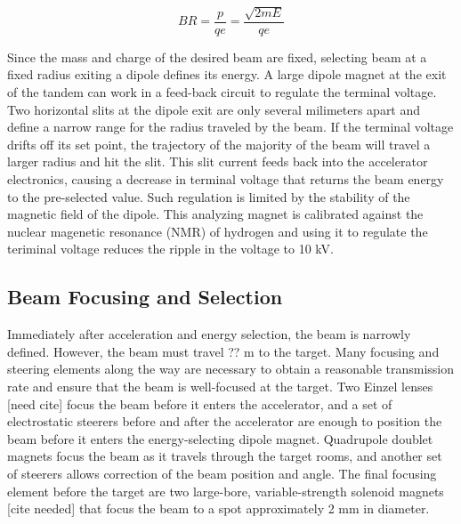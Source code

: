 \begin{equation}
BR = \frac{p}{qe} = \frac{\sqrt{2mE}}{qe}
\label{eqn:rigidity}
\end{equation}

Since the mass and charge of the desired beam are fixed, selecting beam at a fixed radius exiting a dipole defines its energy.  A large dipole magnet at the exit of the tandem can work in a feed-back circuit to regulate the terminal voltage.  Two horizontal slits at the dipole exit are only several milimeters apart and define a narrow range for the radius traveled by the beam.  If the terminal voltage drifts off its set point, the trajectory of the majority of the beam will travel a larger radius and hit the slit.  This slit current feeds back into the accelerator electronics, causing a decrease in terminal voltage that returns the beam energy to the pre-selected value.  Such regulation is limited by the stability of the magnetic field of the dipole.  This analyzing magnet is calibrated against the nuclear magenetic resonance (NMR) of hydrogen and using it to regulate the teriminal voltage reduces the ripple in the voltage to 10 kV.


\subsection{Beam Focusing and Selection}

Immediately after acceleration and energy selection, the beam is narrowly defined.  However, the beam must travel ?? m  to the target.  Many focusing and steering elements along the way are necessary to obtain a reasonable transmission rate and ensure that the beam is well-focused at the target.  Two Einzel lenses [need cite] focus the beam before it enters the accelerator, and a set of electrostatic steerers before and after the accelerator are enough to position the beam before it enters the energy-selecting dipole magnet.  Quadrupole doublet magnets focus the beam as it travels through the target rooms, and another set of steerers allows correction of the beam position and angle.  The final focusing element before the target are two large-bore, variable-strength solenoid magnets [cite needed] that focus the beam to a spot approximately 2 mm in diameter.

